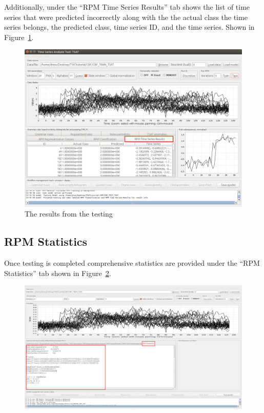 \documentclass[titlepage, letterpaper, 12pt]{article}
\begin{document}
Additionally, under the ``RPM Time Series Results'' tab shows the list of time series that were predicted incorrectly along with the the actual class the time series belongs, the predicted class, time series ID, and the time series.  Shown in Figure~\ref{fig:TSAT-testing-step-3}.

\begin{figure}[H]
	\includegraphics[width=\textwidth]{TSAT-testing-step-3}
	\caption{The results from the testing}
	\label{fig:TSAT-testing-step-3}
\end{figure}

\subsection{RPM Statistics}
Once testing is completed comprehensive statistics are provided under the ``RPM Statistics'' tab shown in Figure~\ref{fig:time-series-analysis-tool-tsatrpmstats}.

\begin{figure}[H]
	\centering
	\includegraphics[width=\textwidth]{"pictures/Time Series Analysis Tool: TSAT_RPMStats"}
	\caption{}
	\label{fig:time-series-analysis-tool-tsatrpmstats}
\end{figure}
\end{document}
